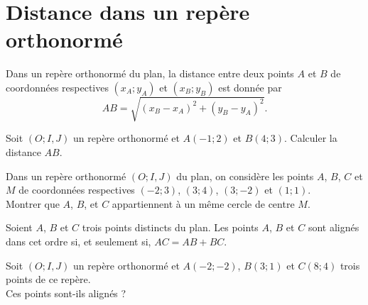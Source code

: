 \documentclass[11pt]{article}
\begin{document}
\section{Distance dans un repère orthonormé}
\begin{prop}
  Dans un repère orthonormé du plan, la distance entre deux points $A$ et $B$ de
  coordonnées respectives $(x_A; y_A)$ et $(x_B; y_B)$ est donnée par
  \[
    AB = \sqrt{(x_B-x_A)^2+(y_B-y_A)^2}.
  \]
\end{prop}

\begin{app}
  Soit $(O; I, J)$ un repère orthonormé et $A(-1; 2)$ et $B(4; 3)$. Calculer la
  distance $AB$.
\end{app}

\begin{app}
  Dans un repère orthonormé $(O; I, J)$ du plan, on considère les points $A$,
  $B$, $C$ et $M$ de coordonnées respectives $(-2; 3)$, $(3; 4)$, $(3; -2)$ et
  $(1; 1)$.\\
  Montrer que $A$, $B$, et $C$ appartiennent à un même cercle de centre $M$.
\end{app}

\begin{prop}
  Soient $A$, $B$ et $C$ trois points distincts du plan. Les points $A$, $B$ et
  $C$ sont alignés dans cet ordre si, et seulement si, $AC = AB+BC$.
\end{prop}

\begin{app}
  Soit $(O; I, J)$ un repère orthonormé et $A(-2; -2)$, $B(3; 1)$ et
  $C(8; 4)$ trois points de ce repère.\\
  Ces points sont-ils alignés ?
\end{app}
\end{document}

